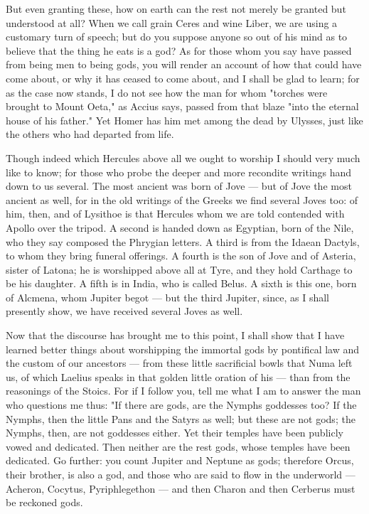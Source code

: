  But even granting these, how on earth can the rest not merely be granted but understood at all? When we call grain Ceres and wine Liber, we are using a customary turn of speech; but do you suppose anyone so out of his mind as to believe that the thing he eats is a god? As for those whom you say have passed from being men to being gods, you will render an account of how that could have come about, or why it has ceased to come about, and I shall be glad to learn; for as the case now stands, I do not see how the man for whom "torches were brought to Mount Oeta," as Accius says, passed from that blaze "into the eternal house of his father." Yet Homer has him met among the dead by Ulysses, just like the others who had departed from life.

 Though indeed which Hercules above all we ought to worship I should very much like to know; for those who probe the deeper and more recondite writings hand down to us several. The most ancient was born of Jove — but of Jove the most ancient as well, for in the old writings of the Greeks we find several Joves too: of him, then, and of Lysithoe is that Hercules whom we are told contended with Apollo over the tripod. A second is handed down as Egyptian, born of the Nile, who they say composed the Phrygian letters. A third is from the Idaean Dactyls, to whom they bring funeral offerings. A fourth is the son of Jove and of Asteria, sister of Latona; he is worshipped above all at Tyre, and they hold Carthage to be his daughter. A fifth is in India, who is called Belus. A sixth is this one, born of Alcmena, whom Jupiter begot — but the third Jupiter, since, as I shall presently show, we have received several Joves as well.

 Now that the discourse has brought me to this point, I shall show that I have learned better things about worshipping the immortal gods by pontifical law and the custom of our ancestors — from these little sacrificial bowls that Numa left us, of which Laelius speaks in that golden little oration of his — than from the reasonings of the Stoics. For if I follow you, tell me what I am to answer the man who questions me thus: "If there are gods, are the Nymphs goddesses too? If the Nymphs, then the little Pans and the Satyrs as well; but these are not gods; the Nymphs, then, are not goddesses either. Yet their temples have been publicly vowed and dedicated. Then neither are the rest gods, whose temples have been dedicated. Go further: you count Jupiter and Neptune as gods; therefore Orcus, their brother, is also a god, and those who are said to flow in the underworld — Acheron, Cocytus, Pyriphlegethon — and then Charon and then Cerberus must be reckoned gods.


